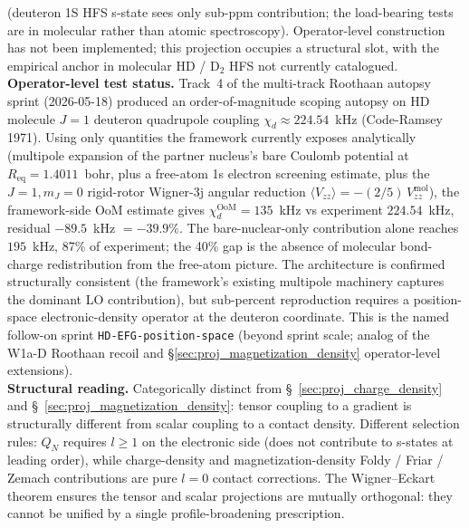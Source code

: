 \documentclass[11pt]{article}
\begin{document}
(deuteron 1S HFS s-state sees only sub-ppm contribution; the
load-bearing tests are in molecular rather than atomic
spectroscopy).  Operator-level construction has not been
implemented; this projection occupies a structural slot, with the
empirical anchor in molecular HD / D$_2$ HFS not currently
catalogued.\\
\textbf{Operator-level test status.}  Track~4 of the multi-track
Roothaan autopsy sprint (2026-05-18) produced an order-of-magnitude
scoping autopsy on HD molecule $J=1$ deuteron quadrupole coupling
$\chi_d \approx 224.54$~kHz (Code-Ramsey 1971).  Using only quantities the
framework currently exposes analytically (multipole expansion of
the partner nucleus's bare Coulomb potential at $R_\text{eq} =
1.4011$~bohr, plus a free-atom 1s electron screening estimate,
plus the $J=1, m_J=0$ rigid-rotor Wigner-3j angular reduction
$\langle V_{zz}\rangle = -(2/5)\,V_{zz}^\text{mol}$), the
framework-side OoM estimate gives $\chi_d^\text{OoM} = 135$~kHz
vs experiment $224.54$~kHz, residual $-89.5$~kHz $= -39.9\%$.
The bare-nuclear-only contribution alone reaches $195$~kHz, 87\%
of experiment; the 40\% gap is the absence of molecular bond-charge
redistribution from the free-atom picture.  The architecture is
confirmed structurally consistent (the framework's existing
multipole machinery captures the dominant LO contribution), but
sub-percent reproduction requires a position-space electronic-density
operator at the deuteron coordinate.  This is the named follow-on
sprint \texttt{HD-EFG-position-space} (beyond sprint scale; analog of the
W1a-D Roothaan recoil and \S\ref{sec:proj_magnetization_density}
operator-level extensions).\\
\textbf{Structural reading.}  Categorically distinct from
\S~\ref{sec:proj_charge_density} and
\S~\ref{sec:proj_magnetization_density}: tensor coupling to a
gradient is structurally different from scalar coupling to a contact
density.  Different selection rules: $Q_N$ requires $l\geq 1$ on the
electronic side (does not contribute to s-states at leading order),
while charge-density and magnetization-density Foldy / Friar / Zemach
contributions are pure $l=0$ contact corrections.  The
Wigner--Eckart theorem ensures the tensor and scalar projections
are mutually orthogonal: they cannot be unified by a single
profile-broadening prescription.
\end{document}
